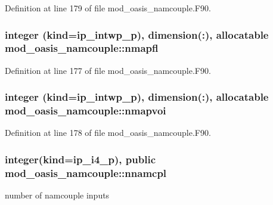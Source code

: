 Definition at line 179 of file mod\+\_\+oasis\+\_\+namcouple.\+F90.

\hypertarget{classmod__oasis__namcouple_ac623e3e0906f57983efc1ab912ce9674}{
\subsubsection[{nmapfl}]{\setlength{\rightskip}{0pt plus 5cm}integer (kind=ip\+\_\+intwp\+\_\+p), dimension(\+:), allocatable mod\+\_\+oasis\+\_\+namcouple\+::nmapfl\hspace{0.3cm}{\ttfamily [private]}}}\label{classmod__oasis__namcouple_ac623e3e0906f57983efc1ab912ce9674}


Definition at line 177 of file mod\+\_\+oasis\+\_\+namcouple.\+F90.

\hypertarget{classmod__oasis__namcouple_adb1f8ce6bf94f488c10ef36b3afb8eca}{
\subsubsection[{nmapvoi}]{\setlength{\rightskip}{0pt plus 5cm}integer (kind=ip\+\_\+intwp\+\_\+p), dimension(\+:), allocatable mod\+\_\+oasis\+\_\+namcouple\+::nmapvoi\hspace{0.3cm}{\ttfamily [private]}}}\label{classmod__oasis__namcouple_adb1f8ce6bf94f488c10ef36b3afb8eca}


Definition at line 178 of file mod\+\_\+oasis\+\_\+namcouple.\+F90.

\hypertarget{classmod__oasis__namcouple_a5ca7cd6a5b9f939b68492200aa92bab4}{
\subsubsection[{nnamcpl}]{\setlength{\rightskip}{0pt plus 5cm}integer(kind=ip\+\_\+i4\+\_\+p), public mod\+\_\+oasis\+\_\+namcouple\+::nnamcpl}}\label{classmod__oasis__namcouple_a5ca7cd6a5b9f939b68492200aa92bab4}


number of namcouple inputs 




